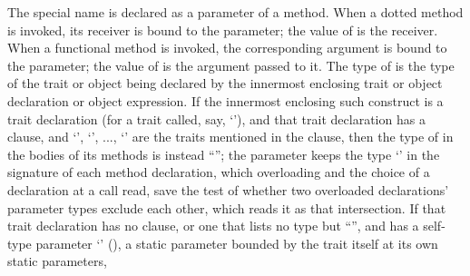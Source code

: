 The special name  is declared as a parameter of a method.
When a dotted method is invoked, its receiver is bound to
the  parameter; the value of  is the receiver.
When a functional method is invoked, the corresponding argument is bound to
the  parameter; the value of  is the argument passed to it.
The type of  is the type of the trait or object being declared by
the innermost enclosing trait or object declaration or object expression.
If the innermost enclosing such construct is a trait declaration (for a trait called,
say, `'), and that trait declaration has a  clause,
and `', `', ..., `' are the traits mentioned in
the  clause, then the type of  in the bodies of its
methods is instead
``'';
the  parameter keeps the type `'
in the signature of each method declaration,
which overloading and the choice of a declaration at a call read,
save the test of whether two overloaded declarations' parameter types
exclude each other, which reads it as that intersection.
If that trait declaration has no  clause, or one that lists no type but ``\EXP{\ldots}'',
and has a self-type parameter `' (),
a static parameter bounded by the trait itself at its own static parameters,
